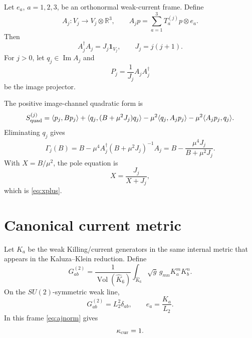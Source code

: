 \documentclass[11pt]{article}
\newcommand{\RR}{\mathbb{R}}
\newcommand{\Imop}{\operatorname{Im}}
\newcommand{\Vol}{\operatorname{Vol}}
\theoremstyle{plain}
\theoremstyle{definition}
\begin{document}
Let \(e_a\), \(a=1,2,3\), be an orthonormal weak-current frame.  Define
\begin{equation}
  A_j:V_j\longrightarrow V_j\otimes\RR^3,\qquad
  A_jp=\sum_{a=1}^3T_a^{(j)}p\otimes e_a .
  \label{eq:aj}
\end{equation}
Then
\begin{equation}
  A_j^\dagger A_j=J_j\mathbf 1_{V_j},
  \qquad J_j=j(j+1).
  \label{eq:ajnorm}
\end{equation}
For \(j>0\), let \(q_j\in\Imop A_j\) and
\begin{equation}
  P_j=\frac{1}{J_j}A_jA_j^\dagger
  \label{eq:proj}
\end{equation}
be the image projector.

The positive image-channel quadratic form is
\begin{equation}
\begin{split}
  S_{\rm quad}^{(j)}
  =
  \langle p_j,Bp_j\rangle
  +\langle q_j,(B+\mu^2J_j)q_j\rangle
  -\mu^2\langle q_j,A_jp_j\rangle
  -\mu^2\langle A_jp_j,q_j\rangle .
  \label{eq:squad}
\end{split}
\end{equation}
Eliminating \(q_j\) gives
\begin{equation}
  \Gamma_j(B)
  =
  B-\mu^4A_j^\dagger(B+\mu^2J_j)^{-1}A_j
  =
  B-\frac{\mu^4J_j}{B+\mu^2J_j}.
  \label{eq:gamma}
\end{equation}
With \(X=B/\mu^2\), the pole equation is
\begin{equation}
  X=\frac{J_j}{X+J_j},
  \label{eq:feshbach-fixed}
\end{equation}
which is \eqref{eq:xplus}.

\section{Canonical current metric}

Let \(K_a\) be the weak Killing/current generators in the same internal metric
that appears in the Kaluza--Klein reduction.  Define
\begin{equation}
  G^{(2)}_{ab}
  =
  \frac{1}{\Vol(\widehat K_6)}
  \int_{\widehat K_6}\sqrt g\,g_{mn}K_a^mK_b^n .
  \label{eq:metric}
\end{equation}
On the \(SU(2)\)-symmetric weak line,
\begin{equation}
  G^{(2)}_{ab}=L_2^2\delta_{ab},
  \qquad e_a=\frac{K_a}{L_2}.
  \label{eq:frame}
\end{equation}
In this frame \eqref{eq:ajnorm} gives
\begin{equation}
  \kappa_{\rm cur}=1.
  \label{eq:kappaone}
\end{equation}
\end{document}
